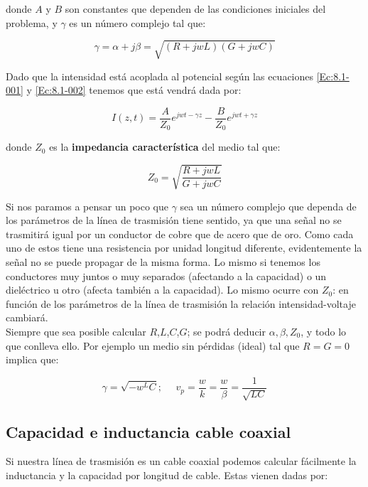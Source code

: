 \documentclass[12pt,a4paper]{article}
\begin{document}
donde $A$ y $B$ son constantes que dependen de las condiciones iniciales del problema, y $\gamma$ es un número complejo tal que:

\begin{equation}
\gamma = \alpha + j \beta = \sqrt{(R+jwL)(G+jwC)}
\end{equation}

Dado que la intensidad está acoplada al potencial según las ecuaciones  \ref{Ec:8.1-001} y \ref{Ec:8.1-002} tenemos que está vendrá dada por:

\begin{equation}
I(z,t) = \dfrac{A}{Z_0} e^{jwt-\gamma z} - \dfrac{B}{Z_0} e^{jwt+\gamma z}
\end{equation}
 
donde $Z_0$ es la \textbf{impedancia característica} del medio tal que:

\begin{equation}
Z_0 = \sqrt{\dfrac{R+jwL}{G+jwC}}
\end{equation}
 
Si nos paramos a pensar un poco que $\gamma$ sea un número complejo que dependa de los parámetros de la línea de trasmisión tiene sentido, ya que una señal no se trasmitirá igual por un conductor de cobre que de acero que de oro. Como cada uno de estos tiene una resistencia por unidad longitud diferente, evidentemente la señal no se puede propagar de la misma forma. Lo mismo si tenemos los conductores muy juntos o muy separados (afectando a la capacidad) o un dieléctrico u otro (afecta también a la capacidad). Lo mismo ocurre con $Z_0$: en función de los parámetros de la línea de trasmisión la relación intensidad-voltaje cambiará. \\

Siempre que sea posible calcular $R$,$L$,$C$,$G$; se podrá deducir $\alpha,\beta,Z_0$, y todo lo que conlleva ello. Por ejemplo un medio sin pérdidas (ideal) tal que $R=G=0$ implica que:

\begin{equation}
\gamma = \sqrt{-w^LC}; \ \ \ \ \ \ v_p = \dfrac{w}{k} = \dfrac{w}{\beta} = \dfrac{1}{\sqrt{LC}}
\end{equation}

\subsection{Capacidad e inductancia cable coaxial}

Si nuestra línea de trasmisión es un cable coaxial podemos calcular fácilmente la inductancia y la capacidad por longitud de cable. Estas vienen dadas por:
\end{document}
